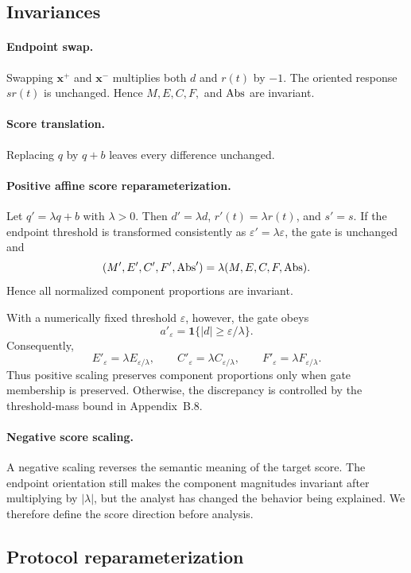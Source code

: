 \subsection{Invariances}
\label{app:invariances}

\paragraph{Endpoint swap.}
Swapping $\mathbf x^{+}$ and $\mathbf x^{-}$ multiplies both $d$ and $r(t)$ by $-1$. The oriented response $s r(t)$ is unchanged. Hence $M,E,C,F,$ and $\mathrm{Abs}$ are invariant.

\paragraph{Score translation.}
Replacing $q$ by $q+b$ leaves every difference unchanged.

\paragraph{Positive affine score reparameterization.}
Let $q'=\lambda q+b$ with $\lambda>0$. Then
$d'=\lambda d$, $r'(t)=\lambda r(t)$, and $s'=s$.
If the endpoint threshold is transformed consistently as
$\varepsilon'=\lambda\varepsilon$, the gate is unchanged and
\[
(M',E',C',F',\mathrm{Abs}')
=
\lambda(M,E,C,F,\mathrm{Abs}).
\]
Hence all normalized component proportions are invariant.

With a numerically fixed threshold $\varepsilon$, however, the gate obeys
\[
a'_{\varepsilon}
=
\mathbf{1}\{|d|\ge\varepsilon/\lambda\}.
\]
Consequently,
\[
E'_{\varepsilon}=\lambda E_{\varepsilon/\lambda},\qquad
C'_{\varepsilon}=\lambda C_{\varepsilon/\lambda},\qquad
F'_{\varepsilon}=\lambda F_{\varepsilon/\lambda}.
\]
Thus positive scaling preserves component proportions only when gate
membership is preserved. Otherwise, the discrepancy is controlled by
the threshold-mass bound in Appendix~B.8.

\paragraph{Negative score scaling.}
A negative scaling reverses the semantic meaning of the target score. The endpoint orientation still makes the component magnitudes invariant after multiplying by $|\lambda|$, but the analyst has changed the behavior being explained. We therefore define the score direction before analysis.

\subsection{Protocol reparameterization}
\label{app:reparameterization}

